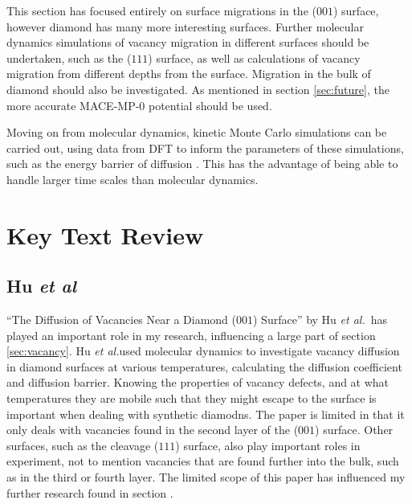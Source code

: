 \documentclass[10pt,a4paper,twocolumn,twoside]{extarticle}
\newcommand{\al}{\emph{et al.}}
\begin{document}
This section has focused entirely on surface migrations in the ($001$) surface, however diamond has many more interesting surfaces. Further molecular dynamics simulations of vacancy migration in different surfaces should be undertaken, such as the ($111$) surface, as well as calculations of vacancy migration from different depths from the surface. Migration in the bulk of diamond should also be investigated.
As mentioned in section \ref{sec:future}, the more accurate MACE-MP-0 potential \cite{MACE} should be used. 

Moving on from molecular dynamics, kinetic Monte Carlo simulations can be carried out, using data from DFT to inform the parameters of these simulations, such as the energy barrier of diffusion \cite{radiation_modelling}. This has the advantage of being able to handle larger time scales than molecular dynamics.



\section{Key Text Review}
\subsection{Hu \textit{et al}}
\label{Hu}
``The Diffusion of Vacancies Near a Diamond ($001$) Surface'' by Hu \al~has played an important role in my research, influencing a large part of section \ref{sec:vacancy}. Hu \al used molecular dynamics to investigate vacancy diffusion in diamond surfaces at various temperatures, calculating the diffusion coefficient and diffusion barrier. Knowing the properties of vacancy defects, and at what temperatures they are mobile such that they might escape to the surface is important when dealing with synthetic diamodns. The paper is limited in that it only deals with vacancies found in the second layer of the ($001$) surface. Other surfaces, such as the cleavage ($111$) surface, also play important roles in experiment, not to mention vacancies that are found further into the bulk, such as in the third or fourth layer. The limited scope of this paper has influenced my further research found in section .
\end{document}
